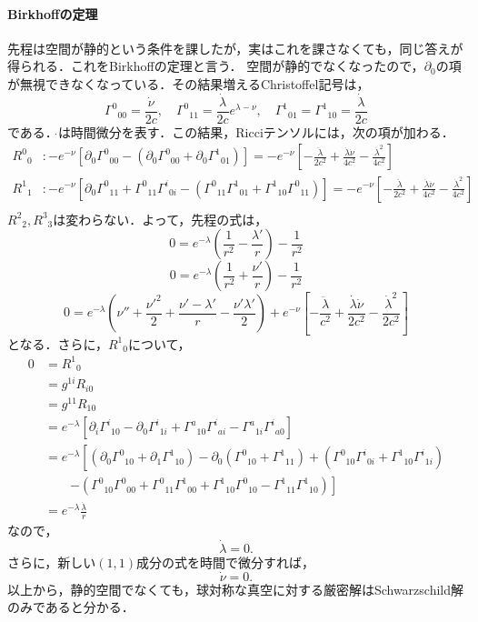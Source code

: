 \documentclass[a4paper]{ltjsreport}
\begin{document}
\paragraph{Birkhoffの定理}
先程は空間が静的という条件を課したが，実はこれを課さなくても，同じ答えが得られる．これをBirkhoffの定理と言う．
空間が静的でなくなったので，$\partial_0$の項が無視できなくなっている．その結果増えるChristoffel記号は，
\[{\Gamma^0}_{00}=\frac{\dot{\nu}}{2c}, \quad{\Gamma^0}_{11}=\frac{\dot{\lambda}}{2c}e^{\lambda - \nu}, \quad{\Gamma^1}_{01}={\Gamma^1}_{10}=\frac{\dot{\lambda}}{2c}\]
である．$\dot{}$は時間微分を表す．この結果，Ricciテンソルには，次の項が加わる．
\begin{align*}
  {R^0}_0 &\colon -  e^{ - \nu}\left[\partial_0{\Gamma^0}_{00} - (\partial_0{\Gamma^0}_{00} + \partial_0{\Gamma^1}_{01})\right]= - e^{ - \nu}\left[ - \frac{\ddot{\lambda}}{2c^2} + \frac{\dot{\lambda}\dot{\nu}}{4c^2} - \frac{\dot{\lambda}^2}{4c^2}\right]\\
  {R^1}_1 &\colon -  e^{ - \nu}\left[\partial_0{\Gamma^0}_{11} + {\Gamma^0}_{11}{\Gamma^i}_{0i} - \left({\Gamma^0}_{11}{\Gamma^1}_{01} + {\Gamma^1}_{10}{\Gamma^0}_{11}\right)\right]= - e^{ - \nu}\left[ - \frac{\ddot{\lambda}}{2c^2} + \frac{\dot{\lambda}\dot{\nu}}{4c^2} - \frac{\dot{\lambda}^2}{4c^2}\right]\\
\end{align*}
${R^2}_2, {R^3}_3$は変わらない．よって，先程の式は，
\[0=e^{ - \lambda}\left(\frac{1}{r^2} - \frac{\lambda'}{r}\right) - \frac{1}{r^2}\]
\[0=e^{ - \lambda}\left(\frac{1}{r^2} + \frac{\nu'}{r}\right) - \frac{1}{r^2}\]
\[0=e^{ - \lambda}\left(\nu'' + \frac{\nu'^2}{2} + \frac{\nu' - \lambda'}{r} - \frac{\nu'\lambda'}{2}\right) + e^{ - \nu}\left[ - \frac{\ddot{\lambda}}{c^2} + \frac{\dot{\lambda}\dot{\nu}}{2c^2} - \frac{\dot{\lambda}^2}{2c^2}\right]\]
となる．さらに，${R^1}_0$について，
\begin{align*}
  0 &= {R^1}_0\\
  &= g^{1i}R_{i0}\\
  &= g^{11}R_{10}\\
  &= e^{ - \lambda}\left[\partial_i{\Gamma^i}_{10} - \partial_0{\Gamma^i}_{1i} + {\Gamma^a}_{10}{\Gamma^i}_{ai} - {\Gamma^a}_{1i}{\Gamma^i}_{a0}\right]\\
  &= e^{ - \lambda}\left[\left(\partial_0{\Gamma^0}_{10} + \partial_1{\Gamma^1}_{10}\right) - \partial_0\left({\Gamma^0}_{10} + {\Gamma^1}_{11}\right) + \left({\Gamma^0}_{10}{\Gamma^i}_{0i} + {\Gamma^1}_{10}{\Gamma^i}_{1i}\right)\right.\\
  &\qquad\left. - \left({\Gamma^0}_{10}{\Gamma^0}_{00} + {\Gamma^0}_{11}{\Gamma^1}_{00} + {\Gamma^1}_{10}{\Gamma^0}_{10} - {\Gamma^1}_{11}{\Gamma^1}_{10}\right)\right]\\
  &= e^{ - \lambda}\frac{\dot{\lambda}}{r}
\end{align*}
なので，
\[\dot{\lambda}=0.\]
さらに，新しい$(1, 1)$成分の式を時間で微分すれば，
\[\dot{\nu}=0.\]
以上から，静的空間でなくても，球対称な真空に対する厳密解はSchwarzschild解のみであると分かる．
\end{document}
